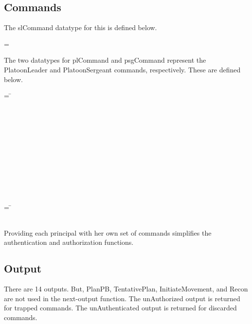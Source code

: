 \documentclass[../../main/main.tex]{subfiles}
\begin{document}
\subsection{Commands}
The slCommand datatype for this  is defined below.

 =   \HOLTokenBar{}  

The two datatypes for plCommand and psgCommand represent the PlatoonLeader and PlatoonSergeant commands, respectively. These are defined below.

\begin{tabbing}
\parskip=8pt
 = \= \\
					     \>\HOLTokenBar{}  \\
					     \>\HOLTokenBar{}  \\
					     \>\HOLTokenBar{} \\
          				     \>\HOLTokenBar{}  \\
				     	     \>\HOLTokenBar{}  \\
					     \>\HOLTokenBar{}  \\
					     \>\HOLTokenBar{}  \\
					     \>\HOLTokenBar{} \\
          				     \>\HOLTokenBar{}  \\
				     	     \>\HOLTokenBar{}  \\
					     \>\HOLTokenBar{} 
\parskip=18pt
\end{tabbing}

\begin{tabbing}
\parskip=8pt
 = \= \\
						\>\HOLTokenBar{} \\
           					\>\HOLTokenBar{} 
\parskip=18pt
\end{tabbing}

Providing each principal with her own set of commands simplifies the authentication and authorization functions.
\subsection{Output}
There are 14 outputs.  But, PlanPB, TentativePlan, InitiateMovement, and Recon are not used in the next-output function.  The unAuthorized output is returned for trapped commands.  The unAuthenticated output is returned for discarded commands.
\end{document}
